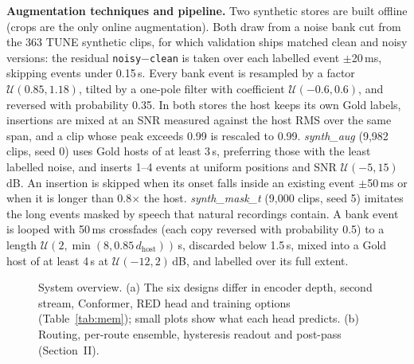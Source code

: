 \documentclass[conference,10pt]{IEEEtran}
\begin{document}
\textbf{Augmentation techniques and pipeline.} Two synthetic stores are built offline (crops are the only online augmentation). Both draw from a noise bank cut from the 363 TUNE synthetic clips, for which validation ships matched clean and noisy versions: the residual \texttt{noisy}$-$\texttt{clean} is taken over each labelled event $\pm$20\,ms, skipping events under 0.15\,s. Every bank event is resampled by a factor $\mathcal{U}(0.85,1.18)$, tilted by a one-pole filter with coefficient $\mathcal{U}(-0.6,0.6)$, and reversed with probability 0.35. In both stores the host keeps its own Gold labels, insertions are mixed at an SNR measured against the host RMS over the same span, and a clip whose peak exceeds 0.99 is rescaled to 0.99. \emph{synth\_aug} (9{,}982 clips, seed 0) uses Gold hosts of at least 3\,s, preferring those with the least labelled noise, and inserts 1--4 events at uniform positions and SNR $\mathcal{U}(-5,15)$\,dB. An insertion is skipped when its onset falls inside an existing event $\pm$50\,ms or when it is longer than 0.8$\times$ the host. \emph{synth\_mask\_t} (9{,}000 clips, seed 5) imitates the long events masked by speech that natural recordings contain. A bank event is looped with 50\,ms crossfades (each copy reversed with probability 0.5) to a length $\mathcal{U}(2,\min(8,0.85\,d_\text{host}))$\,s, discarded below 1.5\,s, mixed into a Gold host of at least 4\,s at $\mathcal{U}(-12,2)$\,dB, and labelled over its full extent.


\begin{figure}[t]
\centering

\caption{System overview. (a) The six designs differ in encoder depth, second stream, Conformer, RED head and training options (Table~\ref{tab:mem}); small plots show what each head predicts. (b) Routing, per-route ensemble, hysteresis readout and post-pass (Section~II).}
\label{fig:sys}
\end{figure}
\end{document}
